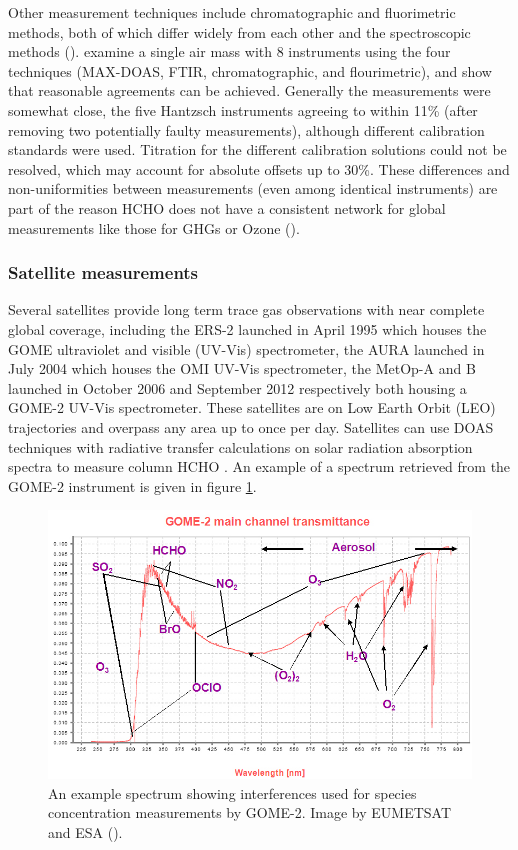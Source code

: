     Other measurement techniques include chromatographic and fluorimetric methods, both of which differ widely from each other and the spectroscopic methods (\cite{Hak2005}).
    \cite{Hak2005} examine a single air mass with 8 instruments using the four techniques (MAX-DOAS, FTIR, chromatographic, and flourimetric), and show that reasonable agreements can be achieved.
    Generally the measurements were somewhat close, the five Hantzsch instruments agreeing to within 11\% (after removing two potentially faulty measurements), although different calibration standards were used.
    Titration for the different calibration solutions could not be resolved, which may account for absolute offsets up to 30\%.
    These differences and non-uniformities between measurements (even among identical instruments) are part of the reason HCHO does not have a consistent network for global measurements like those for GHGs or Ozone (\cite{FortemsCheiney2012}).
  
    
  
  \subsubsection{Satellite measurements}
  \label{LR:HCHO:Sat}
    
    Several satellites provide long term trace gas observations with near complete global coverage, including the ERS-2 launched in April 1995 which houses the GOME ultraviolet and visible (UV-Vis) spectrometer, the AURA launched in July 2004 which houses the OMI UV-Vis spectrometer, the MetOp-A and B launched in October 2006 and September 2012 respectively both housing a GOME-2 UV-Vis spectrometer.
    These satellites are on Low Earth Orbit (LEO) trajectories and overpass any area up to once per day.
    Satellites can use DOAS techniques with radiative transfer calculations on solar radiation absorption spectra to measure column HCHO .
    An example of a spectrum retrieved from the GOME-2 instrument is given in figure \ref{LR:HCHO:Sat:fig_GOME_products}.
    
    \begin{figure}
      \includegraphics[width=\textwidth]{Figures/GOME_SPECTRUM.jpg}
      \caption{%
        An example spectrum showing interferences used for species concentration measurements by GOME-2. Image by EUMETSAT and ESA (\cite{GOME2Image}).
        }
      \label{LR:HCHO:Sat:fig_GOME_products}
    \end{figure}
    
